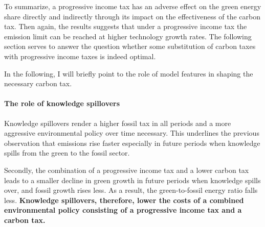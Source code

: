 To summarize, a progressive income tax has an adverse effect on the green energy share directly and indirectly through its impact on the effectiveness of the carbon tax.
Then again, the results suggests that under a progressive income tax the emission limit can be reached at higher technology growth rates. 
The following section serves to answer the question whether some substitution of  carbon taxes with progressive income taxes is indeed optimal. 

 In the following, I will briefly point to the role of model features in shaping the necessary carbon tax. 

\paragraph{The role of knowledge spillovers}

Knowledge spillovers render a higher fossil tax in all periods and a more aggressive environmental policy over time necessary.
This underlines the previous observation that emissions rise faster especially in future periods when knowledge spills from the green to the fossil sector. 


 

Secondly, the combination of a progressive income tax and a lower carbon tax leads to a smaller decline in green growth in future periods when knowledge spills over, and fossil growth rises less. As a result, the green-to-fossil energy ratio falls less. \textbf{Knowledge spillovers, therefore, lower the costs of a combined environmental policy consisting of a progressive income tax and a carbon tax. } 

